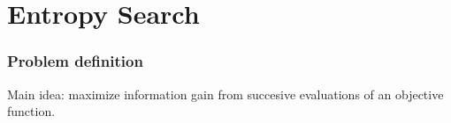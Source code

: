 \documentclass[10pt,handout]{beamer}
\begin{document}


%
%
%




\section{Entropy Search}

\begin{frame}
\frametitle{Problem definition}

Main idea: maximize information gain from succesive evaluations of an objective 
function.

% 
% 





\end{frame}
\end{document}
